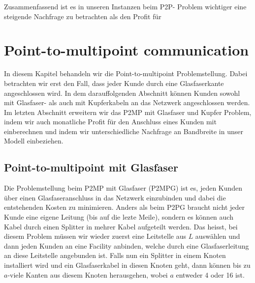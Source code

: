\documentclass[11pt,a4paper]{article}
\theoremstyle{my_th_style1}
\begin{document}
Zusammenfassend ist es in unseren Instanzen beim P2P- Problem wichtiger eine steigende Nachfrage zu betrachten als den Profit für

\section{Point-to-multipoint communication}
In diesem Kapitel behandeln wir die Point-to-multipoint Problemstellung.  Dabei betrachten wir erst den Fall, dass jeder Kunde durch eine Glasfaserkante angeschlossen wird. In dem darauffolgenden Abschnitt k\"onnen Kunden sowohl mit Glasfaser- als auch mit Kupferkabeln an das Netzwerk angeschlossen werden. Im letzten Abschnitt erweitern wir das P2MP mit Glasfaser und Kupfer Problem, indem wir auch monatliche Profit f\"ur den Anschluss eines Kunden mit einberechnen und indem wir unterschiedliche Nachfrage an Bandbreite in unser Modell einbeziehen.

 
 \subsection{Point-to-multipoint mit Glasfaser}
 
 
 Die Problemstellung beim P2MP mit Glasfaser (P2MPG) ist es,  jeden Kunden \"uber einen Glasfaseranschluss in das Netzwerk einzubinden und dabei die entstehenden Kosten zu minimieren. Anders als beim P2PG braucht nicht jeder Kunde eine eigene Leitung (bis auf die lezte Meile), sondern es k\"onnen auch Kabel durch einen Splitter in mehrer Kabel aufgeteilt werden.  Das heisst, bei diesem Problem  m\"ussen wir wieder zuerst eine Leitstelle aus $L$ ausw\"ahlen und dann jeden Kunden an eine Facility anbinden, welche durch eine Glasfaserleitung  an diese Leitstelle angebunden ist. Falls nun ein Splitter in einem Knoten installiert wird und ein Glasfaserkabel in diesen Knoten geht, dann k\"onnen bis zu $a$-viele Kanten aus diesem Knoten herausgehen, wobei $a$ entweder 4 oder 16 ist.
\end{document}
